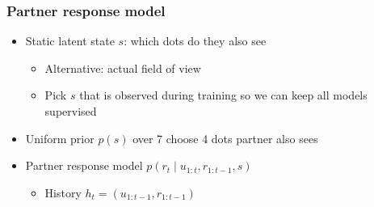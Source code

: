 \documentclass{beamer}
\begin{document}
\begin{frame}
\frametitle{Partner response model}
\begin{itemize}
\item Static latent state $s$: which dots do they also see
    \begin{itemize}
    \item Alternative: actual field of view
    \item Pick $s$ that is observed during training so we can keep
        all models supervised
    \end{itemize}
\item Uniform prior $p(s)$ over 7 choose 4 dots partner also sees
\item Partner response model $p(r_t \mid u_{1:t},r_{1:t-1}, s)$
    \begin{itemize}
    \item History $h_t = (u_{1:t-1}, r_{1:t-1})$
    \end{itemize}
\begin{center}
\end{center}
\end{itemize}
\end{frame}
\end{document}
